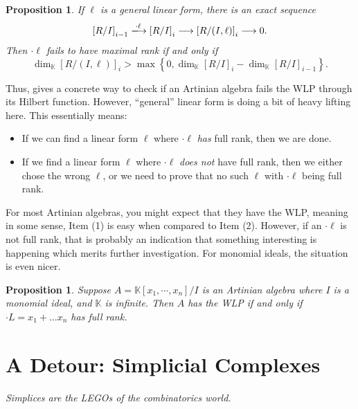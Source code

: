 \documentclass[12pt,a4paper]{article}
\newcommand{\KK}{\mathbb{K}}
\newtheorem{proposition}[theorem]{Proposition}
\theoremstyle{definition}
\numberwithin{equation}{section}
\begin{document}
\begin{proposition}\label{proposition: hilbert function fail WLP}
    If $\ell$ is a general linear form, there is an exact sequence
    \begin{equation*}
        \left[ R/I \right]_{i-1} \xlongrightarrow[]{\cdot \ell} \left[ R/I \right]_i \longrightarrow \left[ R/(I, \ell) \right]_i \longrightarrow 0.
    \end{equation*}
    Then $\cdot \ell$ \emph{fails} to have maximal rank if and only if
    \begin{equation*}
        \dim_{\KK}{\left[R / (I,\ell) \right]_i} > \max{\left\{ 0, \dim_{\KK}{\left[ R/I \right]_i} - \dim_{\KK}{\left[ R/I \right]_{i-1}} \right\}}.
    \end{equation*}
\end{proposition}

Thus,  gives a concrete way to check if an Artinian algebra fails the WLP through its Hilbert function.
However, ``general'' linear form is doing a bit of heavy lifting here.
This essentially means:
\begin{itemize}
    \item If we can find a linear form $\ell$ where $\cdot \ell$ \emph{has} full rank, then we are done.

    \item If we find a linear form $\ell$ where $\cdot \ell$ \emph{does not} have full rank, then we either chose the wrong $\ell$, or we need to prove that no such $\ell$ with $\cdot \ell$ being full rank.
\end{itemize}

For most Artinian algebras, you might expect that they have the WLP, meaning in some sense, Item (1) is easy when compared to Item (2).
However, if an $\cdot \ell$ is not full rank, that is probably an indication that something interesting is happening which merits further investigation.
For monomial ideals, the situation is even nicer.

\begin{proposition}{\cite[Proposition~2.2]{migliore_monomial_2011}}
    Suppose $A = \KK[x_1,\cdots,x_n] / I$ is an Artinian algebra where $I$ is a monomial ideal, and $\KK$ is infinite.
    Then $A$ has the WLP if and only if $\cdot L = x_1 + \dots x_n$ has full rank.
\end{proposition}




\newpage
\section{A Detour: Simplicial Complexes}
\textit{Simplices are the LEGOs of the combinatorics world.}
\end{document}
